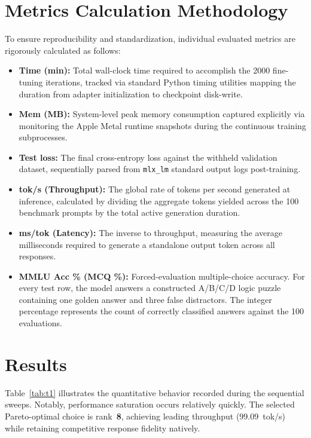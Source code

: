 \documentclass[10pt,a4paper]{article}
\begin{document}
\section*{Metrics Calculation Methodology}
To ensure reproducibility and standardization, individual evaluated metrics are rigorously calculated as follows:
\begin{itemize}
  \item \textbf{Time (min):} Total wall-clock time required to accomplish the 2000 fine-tuning iterations, tracked via standard Python timing utilities mapping the duration from adapter initialization to checkpoint disk-write.
  \item \textbf{Mem (MB):} System-level peak memory consumption captured explicitly via monitoring the Apple Metal runtime snapshots during the continuous training subprocesses.
  \item \textbf{Test loss:} The final cross-entropy loss against the withheld validation dataset, sequentially parsed from \texttt{mlx\_lm} standard output logs post-training.
  \item \textbf{tok/s (Throughput):} The global rate of tokens per second generated at inference, calculated by dividing the aggregate tokens yielded across the 100 benchmark prompts by the total active generation duration.
  \item \textbf{ms/tok (Latency):} The inverse to throughput, measuring the average milliseconds required to generate a standalone output token across all responses.
  \item \textbf{MMLU Acc \% (MCQ \%):} Forced-evaluation multiple-choice accuracy. For every test row, the model answers a constructed A/B/C/D logic puzzle containing one golden answer and three false distractors. The integer percentage represents the count of correctly classified answers against the 100 evaluations.
\end{itemize}

\section*{Results}
Table~\ref{tab:t1} illustrates the quantitative behavior recorded during the sequential sweeps. Notably, performance saturation occurs relatively quickly. The selected Pareto-optimal choice is rank~\textbf{8}, achieving leading throughput (99.09~tok/s) while retaining competitive response fidelity natively. 
\end{document}
